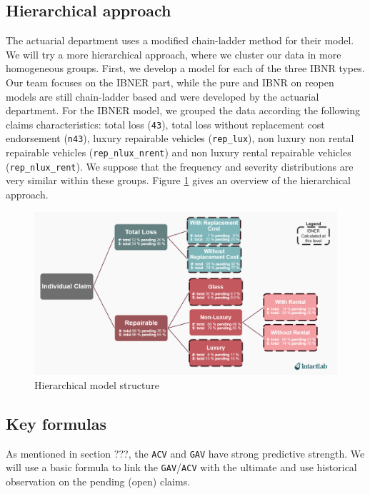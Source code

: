\subsection{Hierarchical approach}
	The actuarial department uses a modified chain-ladder method for their model. We will try a more hierarchical approach, where we cluster our data in more homogeneous groups. First, we develop a model for each of the three IBNR types. Our team focuses on the IBNER part, while the pure and IBNR on reopen models are still chain-ladder based and were developed by the actuarial department. For the IBNER model, we grouped the data according the following claims characteristics:  total loss (\texttt{43}), total loss without replacement cost endorsement (\texttt{n43}), luxury repairable vehicles (\texttt{rep\_lux}), non luxury non rental repairable vehicles (\texttt{rep\_nlux\_nrent}) and non luxury rental repairable vehicles (\texttt{rep\_nlux\_rent}). We suppose that the frequency and severity distributions are very similar within these groups. Figure \ref{Fig_hier_model} gives an overview of the hierarchical approach.
	\begin{figure}[H]
		\begin{center}
			\includegraphics[scale=0.4]{Graphiques/Hier_model} 
			\renewcommand{\figurename}{Figure}
			\caption{Hierarchical model structure}\label{Fig_hier_model}
		\end{center}
	\end{figure}
 
\subsection{Key formulas}
	As mentioned in section ???, the \texttt{ACV} and \texttt{GAV} have strong predictive strength. We will use a basic formula to link the \texttt{GAV}/\texttt{ACV} with the ultimate and use historical observation on the pending (open) claims.

